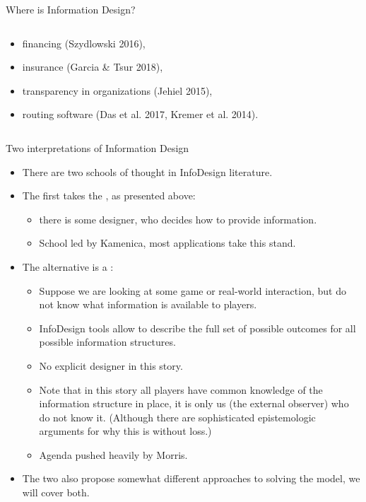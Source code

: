 \documentclass[english,10pt
,aspectratio=169
]{beamer}
\begin{document}
\begin{frame}{Where is Information Design?}
\begin{columns}
\begin{column}{0.5\linewidth}
\begin{itemize}
				\item financing (Szydlowski 2016), 
				
				\item insurance (Garcia \& Tsur 2018), 
				
				\item transparency in organizations (Jehiel 2015), 
				
				\item routing software (Das et al. 2017, Kremer et al. 2014).
			\end{itemize}
		\end{column}
	\end{columns}
	
\end{frame}


\begin{frame}{Two interpretations of Information Design}
\begin{itemize}
	\item There are two schools of thought in InfoDesign literature.
	\item The first takes the , as presented above:
	\begin{itemize}
		\item there is some designer, who decides how to provide information.
		\item School led by Kamenica, most applications take this stand. %
	\end{itemize}
	\item The alternative is a :
	\begin{itemize}
		\item Suppose we are looking at some game or real-world interaction, but do not know what information is available to players.
		\item InfoDesign tools allow to describe the full set of possible outcomes for all possible information structures. 
		\item No explicit designer in this story.
		\item Note that in this story all players have common knowledge of the information structure in place, it is only us (the external observer) who do not know it. (Although there are sophisticated epistemologic arguments for why this is without loss.)
		\item Agenda pushed heavily by Morris.
	\end{itemize}
	\item The two also propose somewhat different approaches to solving the model, we will cover both.
\end{itemize}
\end{frame}
\end{document}
